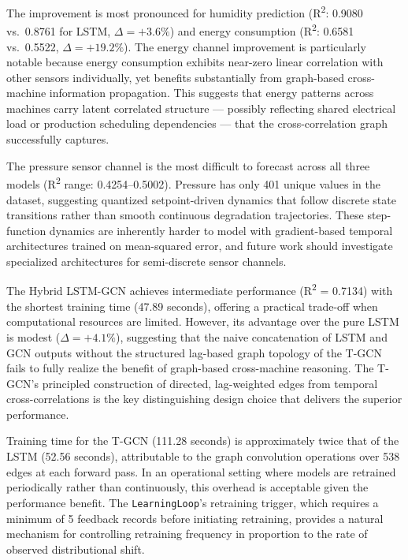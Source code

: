 The improvement is most pronounced for humidity prediction (R\textsuperscript{2}: 0.9080 vs.\ 0.8761 for LSTM, $\Delta = +3.6\%$) and energy consumption (R\textsuperscript{2}: 0.6581 vs.\ 0.5522, $\Delta = +19.2\%$). The energy channel improvement is particularly notable because energy consumption exhibits near-zero linear correlation with other sensors individually, yet benefits substantially from graph-based cross-machine information propagation. This suggests that energy patterns across machines carry latent correlated structure --- possibly reflecting shared electrical load or production scheduling dependencies --- that the cross-correlation graph successfully captures.

The pressure sensor channel is the most difficult to forecast across all three models (R\textsuperscript{2} range: 0.4254--0.5002). Pressure has only 401 unique values in the dataset, suggesting quantized setpoint-driven dynamics that follow discrete state transitions rather than smooth continuous degradation trajectories. These step-function dynamics are inherently harder to model with gradient-based temporal architectures trained on mean-squared error, and future work should investigate specialized architectures for semi-discrete sensor channels.

The Hybrid LSTM-GCN achieves intermediate performance (R\textsuperscript{2} = 0.7134) with the shortest training time (47.89 seconds), offering a practical trade-off when computational resources are limited. However, its advantage over the pure LSTM is modest ($\Delta = +4.1\%$), suggesting that the naive concatenation of LSTM and GCN outputs without the structured lag-based graph topology of the T-GCN fails to fully realize the benefit of graph-based cross-machine reasoning. The T-GCN's principled construction of directed, lag-weighted edges from temporal cross-correlations is the key distinguishing design choice that delivers the superior performance.

Training time for the T-GCN (111.28 seconds) is approximately twice that of the LSTM (52.56 seconds), attributable to the graph convolution operations over 538 edges at each forward pass. In an operational setting where models are retrained periodically rather than continuously, this overhead is acceptable given the performance benefit. The \texttt{LearningLoop}'s retraining trigger, which requires a minimum of 5 feedback records before initiating retraining, provides a natural mechanism for controlling retraining frequency in proportion to the rate of observed distributional shift.

